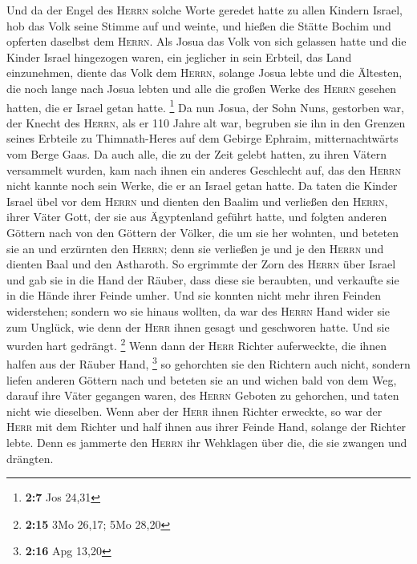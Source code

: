  Und da der Engel des \textsc{Herrn} solche Worte geredet
hatte zu allen Kindern Israel, hob das Volk seine Stimme auf und weinte,
 und hießen die Stätte Bochim und opferten daselbst dem
\textsc{Herrn}.  Als Josua das Volk von sich gelassen
hatte und die Kinder Israel hingezogen waren, ein jeglicher in sein
Erbteil, das Land einzunehmen,  diente das Volk dem
\textsc{Herrn}, solange Josua lebte und die Ältesten, die noch lange
nach Josua lebten und alle die großen Werke des \textsc{Herrn} gesehen
hatten, die er Israel getan hatte. \footnote{\textbf{2:7} Jos 24,31}
 Da nun Josua, der Sohn Nuns, gestorben war, der Knecht
des \textsc{Herrn}, als er 110 Jahre alt war,  begruben
sie ihn in den Grenzen seines Erbteile zu Thimnath-Heres auf dem Gebirge
Ephraim, mitternachtwärts vom Berge Gaas.  Da auch alle,
die zu der Zeit gelebt hatten, zu ihren Vätern versammelt wurden, kam
nach ihnen ein anderes Geschlecht auf, das den \textsc{Herrn} nicht
kannte noch sein Werke, die er an Israel getan hatte.  Da
taten die Kinder Israel übel vor dem \textsc{Herrn} und dienten den
Baalim  und verließen den \textsc{Herrn}, ihrer Väter
Gott, der sie aus Ägyptenland geführt hatte, und folgten anderen Göttern
nach von den Göttern der Völker, die um sie her wohnten, und beteten sie
an und erzürnten den \textsc{Herrn};  denn sie verließen
je und je den \textsc{Herrn} und dienten Baal und den Astharoth.
 So ergrimmte der Zorn des \textsc{Herrn} über Israel und
gab sie in die Hand der Räuber, dass diese sie beraubten, und verkaufte
sie in die Hände ihrer Feinde umher. Und sie konnten nicht mehr ihren
Feinden widerstehen;  sondern wo sie hinaus wollten, da
war des \textsc{Herrn} Hand wider sie zum Unglück, wie denn der
\textsc{Herr} ihnen gesagt und geschworen hatte. Und sie wurden hart
gedrängt. \footnote{\textbf{2:15} 3Mo 26,17; 5Mo 28,20} 
Wenn dann der \textsc{Herr} Richter auferweckte, die ihnen halfen aus
der Räuber Hand, \footnote{\textbf{2:16} Apg 13,20}  so
gehorchten sie den Richtern auch nicht, sondern liefen anderen Göttern
nach und beteten sie an und wichen bald von dem Weg, darauf ihre Väter
gegangen waren, des \textsc{Herrn} Geboten zu gehorchen, und taten nicht
wie dieselben.  Wenn aber der \textsc{Herr} ihnen Richter
erweckte, so war der \textsc{Herr} mit dem Richter und half ihnen aus
ihrer Feinde Hand, solange der Richter lebte. Denn es jammerte den
\textsc{Herrn} ihr Wehklagen über die, die sie zwangen und drängten.
